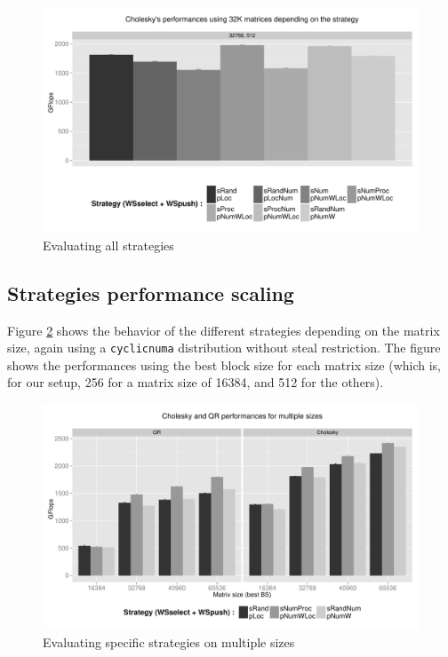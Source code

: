 \documentclass{Styles/llncs}
\begin{document}
\begin{figure}[t]
  \centering
  \includegraphics[scale=0.5]{figures/graph_all_strat.pdf}
\caption{Evaluating all strategies}
\label{fig:eval-all-strat}
\end{figure}


\subsection{Strategies performance scaling}

Figure \ref{fig:eval-strat-sizes} shows the behavior of the different strategies
depending on the matrix size, again using a \verb/cyclicnuma/ distribution
without steal restriction. The figure shows the performances using
the best block size for each matrix size (which is, for our setup, 256 for a matrix
size of 16384, and 512 for the others).

\begin{figure}[t]
  \centering
  \includegraphics[scale=0.5]{figures/graph_details_strat.pdf}
\caption{Evaluating specific strategies on multiple sizes}
\label{fig:eval-strat-sizes}
\end{figure}
\end{document}
